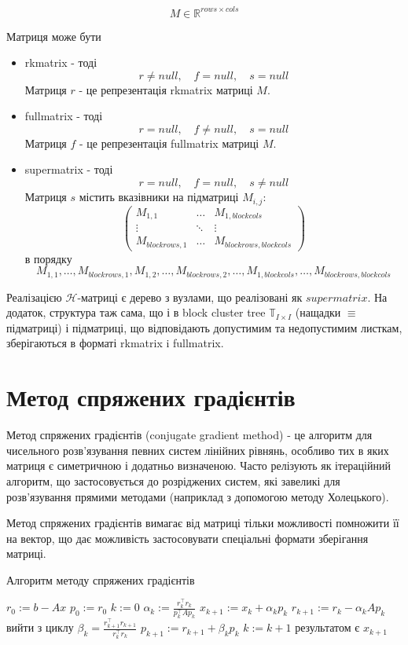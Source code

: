 \documentclass[12pt]{report}
\begin{document}
	$$M\in\mathbb{R}^{rows\times cols}$$
	\par Матриця може бути 
	\begin{itemize}
		\item rkmatrix - тоді 
		$$r\not=null,\quad
		f=null,\quad
		s=null$$
		Матриця $r$ - це репрезентація rkmatrix матриці $M$.
		\item fullmatrix - тоді  
		$$r=null,\quad
		f\not=null,\quad
		s=null$$
		Матриця $f$ - це репрезентація fullmatrix матриці $M$.
		\item supermatrix - тоді
		$$r=null,\quad
		f=null,\quad
		s\not=null$$
		Матриця $s$ містить вказівники на підматриці $M_{i,j}$:
		\[
			\begin{pmatrix}
				M_{1,1} & \dots & M_{1,blockcols}\\
				\vdots & \ddots & \vdots \\
				M_{blockrows,1} &\dots  & M_{blockrows,blockcols}
			\end{pmatrix}
		\]
		в порядку 
		$$M_{1,1},\dots,M_{blockrows,1},M_{1,2},\dots,M_{blockrows,2},\dots,M_{1,blockcols},\dots,M_{blockrows,blockcols}$$
	\end{itemize}
	\par Реалізацією $\mathcal{H}$-матриці є дерево з вузлами, що реалізовані як $supermatrix$. На додаток, структура таж сама, що і в block cluster tree $\mathbb{T}_{I\times I}$ (нащадки $\equiv$ підматриці) і підматриці, що відповідають допустимим та недопустимим листкам, зберігаються в форматі rkmatrix i fullmatrix.
	\section{Метод спряжених градієнтів}
	\par Метод спряжених градієнтів (conjugate gradient method) - це алгоритм для чисельного розв'язування певних систем лінійних рівнянь, особливо тих в яких матриця є симетричною і додатньо визначеною. Часто релізують як ітераційний алгоритм, що застосовується до розріджених систем, які завеликі для розв'язування прямими методами (наприклад з допомогою методу Холецького).
	\par Метод спряжених градієнтів вимагає від матриці тільки можливості помножити її на вектор, що дає можливість застосовувати спеціальні формати зберігання матриці.
	\begin{algorithm}
	\caption{Алгоритм методу спряжених градієнтів}
	\begin{algorithmic}
		\STATE $r_0:=b-Ax$
		\STATE $p_0:=r_0$
		\STATE $k:=0$
			\STATE $\alpha_k:=\frac{r_k^{\intercal}r_k}{p_k^{\intercal}Ap_k}$
			\STATE $x_{k+1}:=x_k+\alpha_kp_k$
			\STATE $r_{k+1}:=r_k-\alpha_kAp_k$
				\STATE вийти з циклу
			\ENDIF
			\STATE $\beta_k=\frac{r_{k+1}^{\intercal}r_{k+1}}{r_k^\intercal r_k}$
			\STATE $p_{k+1}:=r_{k+1}+\beta_kp_k$
			\STATE $k:=k+1$
		\ENDWHILE
		\STATE результатом є $x_{k+1}$
	\end{algorithmic}
	
	\end{algorithm}
\end{document}
